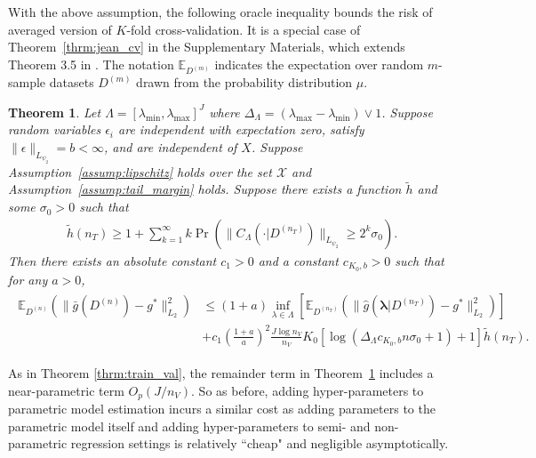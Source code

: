\documentclass[12pt]{article} %
\newtheorem{theorem}{Theorem}
\theoremstyle{definition}
\begin{document}
With the above assumption, the following oracle inequality bounds the risk of averaged version of $K$-fold cross-validation.
It is a special case of Theorem~\ref{thrm:jean_cv} in the Supplementary Materials, which extends Theorem 3.5 in \citet{lecue2012oracle}.
The notation $\mathbb{E}_{D^{(m)}}$ indicates the expectation over random $m$-sample datasets $D^{(m)}$ drawn from the probability distribution $\mu$.
\begin{theorem}
	\label{thrm:kfold}
	Let $\Lambda=[\lambda_{\min},\lambda_{\max}]^{J}$ where $\Delta_{\Lambda} = (\lambda_{\max} - \lambda_{\min}) \vee 1$.
	Suppose random variables $\epsilon_i$ are independent with expectation zero, satisfy $\|\epsilon\|_{L_{\psi_2}}= b <\infty$, and are independent of $X$.
	Suppose Assumption~\ref{assump:lipschitz} holds over the set $\mathcal{X}$ and Assumption~\ref{assump:tail_margin} holds.
	Suppose there exists a function $\tilde{h}$ and some $\sigma_0 > 0$ such that
	\begin{align}
	\tilde{h}(n_{T})
	\ge
	1 + \sum_{k=1}^{\infty}
	k\Pr\left(\|C_\Lambda(\cdot |D^{(n_{T})})\|_{L_{\psi_{2}}}\ge2^{k}\sigma_{0}\right).
	\label{eq:prob_bound_cv}
	\end{align}
	Then there exists an absolute constant $c_{1}>0$ and a constant $c_{K_0, b}>0$ such that for any $a > 0$,
	\begin{align}
	\begin{split}
	\mathbb{E}_{D^{(n)}}\left(
	\|
	\bar{g}(D^{(n)})
	-g^{*}
	\|_{L_{2}}^{2}\right)
	& \le	(1+a)
	\inf_{\lambda\in\Lambda}
	\left[\mathbb{E}_{D^{(n_{T})}}\left(\|
	\hat{g}(\boldsymbol{\lambda}|D^{(n_{T})})
	-g^{*}\|_{L_{2}}^{2}\right)\right] \\
	& +
	c_{1}
	\left (\frac{1+a}{a} \right )^2
	\frac{J\log n_{V}}{n_{V}}
	K_0
	\left[\log\left(\Delta_{\Lambda} c_{K_0, b} n \sigma_0 +1\right)+1\right]
	\tilde{h}(n_{T}).
	\end{split}
	\label{eq:cv_lipschitz_oracle_ineq}
	\end{align}
\end{theorem}

As in Theorem \ref{thrm:train_val}, the remainder term in Theorem~\ref{thrm:kfold} includes a near-parametric term $O_p(J/n_V)$.
So as before, adding hyper-parameters to parametric model estimation incurs a similar cost as adding parameters to the parametric model itself and adding hyper-parameters to semi- and non-parametric regression settings is relatively ``cheap" and negligible asymptotically.
\end{document}

